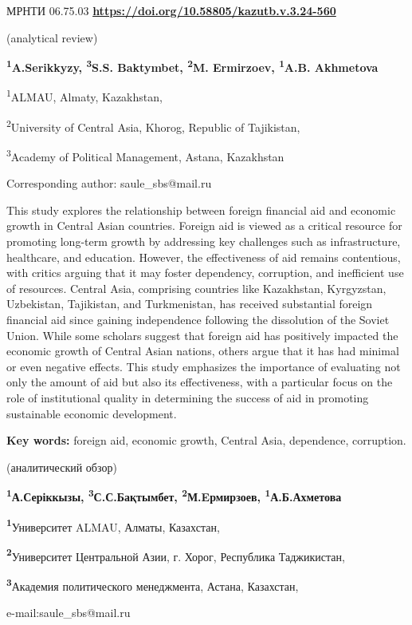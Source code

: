 \newpage
МРНТИ 06.75.03
\hfill {\bfseries \href{https://doi.org/10.58805/kazutb.v.3.24-560}{https://doi.org/10.58805/kazutb.v.3.24-560}}


\begin{center}
(analytical review)

{\bfseries \textsuperscript{1}A.Serikkyzy, \textsuperscript{3}S.S.
Baktymbet\envelope, \textsuperscript{2}M. Ermirzoev,
\textsuperscript{1}A.B. Akhmetova}

\textsuperscript{1}ALMAU, Almaty, Kazakhstan,

\textsuperscript{2}University of Central Asia, Khorog, Republic of
Tajikistan,

\textsuperscript{3}Academy of Political Management, Astana, Kazakhstan
\end{center}

\envelope Corresponding author: saule\_sbs@mail.ru

This study explores the relationship between foreign financial aid and
economic growth in Central Asian countries. Foreign aid is viewed as a
critical resource for promoting long-term growth by addressing key
challenges such as infrastructure, healthcare, and education. However,
the effectiveness of aid remains contentious, with critics arguing that
it may foster dependency, corruption, and inefficient use of resources.
Central Asia, comprising countries like Kazakhstan, Kyrgyzstan,
Uzbekistan, Tajikistan, and Turkmenistan, has received substantial
foreign financial aid since gaining independence following the
dissolution of the Soviet Union. While some scholars suggest that
foreign aid has positively impacted the economic growth of Central Asian
nations, others argue that it has had minimal or even negative effects.
This study emphasizes the importance of evaluating not only the amount
of aid but also its effectiveness, with a particular focus on the role
of institutional quality in determining the success of aid in promoting
sustainable economic development.

{\bfseries Key words:} foreign aid, economic growth, Central Asia,
dependence, corruption.


\begin{center}
(аналитический обзор)

{\bfseries \textsuperscript{1}А.Серіккызы,
\textsuperscript{3}С.С.Бақтымбет\envelope,
\textsuperscript{2}М.Eрмирзоев, \textsuperscript{1}А.Б.Ахметова}

{\bfseries \textsuperscript{1}}Университет ALMAU, Алматы, Казахстан,

{\bfseries \textsuperscript{2}}Университет Центральной Азии, г. Хорог,
Республика Таджикистан,

{\bfseries \textsuperscript{3}}Академия политического менеджмента, Астана,
Казахстан,

e-mail:saule\_sbs@mail.ru
\end{center}

